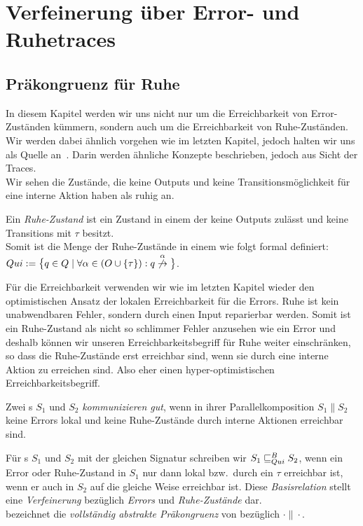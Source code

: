 \chapter{Verfeinerung über Error- und Ruhetraces}

\section{Präkongruenz für Ruhe}

In diesem Kapitel werden wir uns nicht nur um die Erreichbarkeit von
Error-Zuständen kümmern, sondern auch um die Erreichbarkeit von
Ruhe-Zuständen. Wir werden dabei ähnlich vorgehen wie im letzten Kapitel,
jedoch halten wir uns als Quelle an~\cite{Chilton2013}. Darin werden ähnliche
Konzepte beschrieben, jedoch aus Sicht der Traces.\\
Wir sehen die Zustände, die keine Outputs und keine Transitionsmöglichkeit für
eine interne Aktion haben als ruhig an.

\begin{Def}[Ruhe]
  Ein \emph{Ruhe-Zustand} ist ein Zustand in einem \EIO{} der keine
  Outputs zulässt und keine Transitions mit $\tau$ besitzt.\\
  Somit ist die Menge der Ruhe-Zustände in einem \EIO{} wie folgt formal
  definiert: $Qui:=\big\{q\in Q\mid \forall \alpha\in (O\cup \{\tau\}): q
  \overset{\alpha}{\not{\hspace{-0.1cm}\rightarrow}}\big\}$.
\end{Def}

Für die Erreichbarkeit verwenden wir wie im letzten Kapitel wieder den
optimistischen Ansatz der lokalen Erreichbarkeit für die Errors. Ruhe ist kein
unabwendbaren Fehler, sondern durch einen Input reparierbar werden. Somit ist
ein Ruhe-Zustand als nicht so schlimmer Fehler anzusehen wie ein Error und
deshalb können wir unseren Erreichbarkeitsbegriff für Ruhe weiter einschränken,
so dass die Ruhe-Zustände erst erreichbar sind, wenn sie durch eine interne
Aktion zu erreichen sind. Also eher einen hyper-optimistischen
Erreichbarkeitsbegriff.

\begin{Def}
  Zwei \EIO{}s $S_1$ und $S_2$ \emph{kommunizieren gut}, wenn in ihrer
  Parallelkomposition $S_1\| S_2$ keine Errors lokal und keine Ruhe-Zustände
  durch interne Aktionen erreichbar sind.
\end{Def}

\begin{Def}
  Für \EIO{}s $S_1$ und $S_2$ mit der gleichen Signatur schreiben wir
  $S_1\sqsubseteq _{Qui}^B S_2$, wenn ein Error oder Ruhe-Zustand in $S_1$ nur dann lokal
  bzw.\ durch ein $\tau$ erreichbar ist, wenn er auch in $S_2$ auf die gleiche
  Weise erreichbar ist. Diese \emph{Basisrelation} stellt eine \emph{Verfeinerung}
  bezüglich \emph{Errors} und \emph{Ruhe-Zustände} dar.\\
  \QCRel{} bezeichnet die \emph{vollständig abstrakte Präkongruenz} von
  \QBRel{} bezüglich $\cdot\|\cdot$.
\end{Def}

